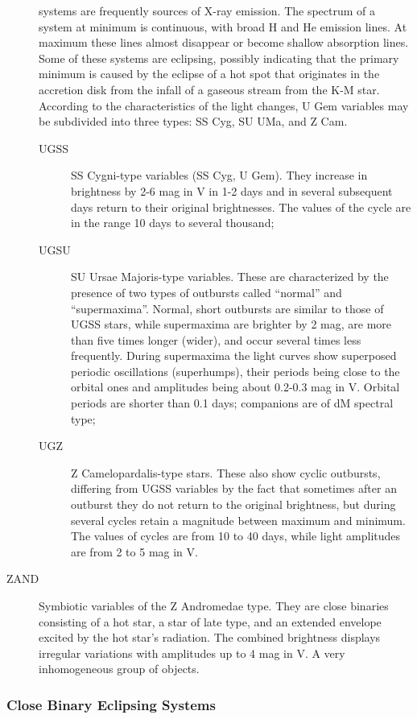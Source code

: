 \begin{description}
				systems are frequently sources of X-ray emission. The spectrum of a
				system at minimum is continuous, with broad H and He emission lines. At
				maximum these lines almost disappear or become shallow absorption lines.
				Some of these systems are eclipsing, possibly indicating that the
				primary minimum is caused by the eclipse of a hot spot that originates
				in the accretion disk from the infall of a gaseous stream from the K-M
				star. According to the characteristics of the light changes, U Gem
				variables may be subdivided into three types: SS Cyg, SU UMa, and Z Cam.
	\begin{description}
\item[UGSS]		SS Cygni-type variables (SS Cyg, U Gem). They increase in
				brightness by 2-6 mag in V in 1-2 days and in several subsequent days
				return to their original brightnesses. The values of the cycle are in
				the range 10 days to several thousand;
\item[UGSU]		SU Ursae Majoris-type variables. These are characterized
				by the presence of two types of outbursts called ``normal'' and
				``supermaxima''. Normal, short outbursts are similar to those of UGSS
				stars, while supermaxima are brighter by 2 mag, are more than five times
				longer (wider), and occur several times less frequently. During
				supermaxima the light curves show superposed periodic oscillations
				(superhumps), their periods being close to the orbital ones and
				amplitudes being about 0.2-0.3 mag in V. Orbital periods are shorter
				than 0.1 days; companions are of dM spectral type;
\item[UGZ]		Z Camelopardalis-type stars. These also show cyclic
				outbursts, differing from UGSS variables by the fact that sometimes
				after an outburst they do not return to the original brightness, but
				during several cycles retain a magnitude between maximum and minimum.
				The values of cycles are from 10 to 40 days, while light amplitudes are
				from 2 to 5 mag in V.
	\end{description}
\item[ZAND]		Symbiotic variables of the Z Andromedae type. They are
				close binaries consisting of a hot star, a star of late type, and an
				extended envelope excited by the hot star's radiation. The combined
				brightness displays irregular variations with amplitudes up to 4 mag in
				V. A very inhomogeneous group of objects.
\end{description}

\subsubsection{Close Binary Eclipsing Systems}
\label{close-binary-eclipsing-systems}

